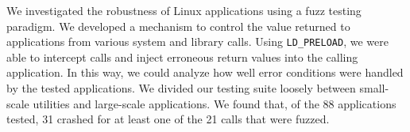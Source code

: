We investigated the robustness of Linux applications using a fuzz testing paradigm. We developed a mechanism to control the value returned to applications from various system and library calls. Using \texttt{LD\_PRELOAD}, we were able to intercept calls and inject erroneous return values into the calling application. In this way, we could analyze how well error conditions were handled by the tested applications. We divided our testing suite loosely between small-scale utilities and large-scale applications. We found that, of the 88 applications tested, 31 crashed for at least one of the 21 calls that were fuzzed.